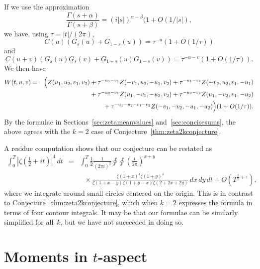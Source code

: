 \documentclass[12pt,letterpaper]{amsart}
\theoremstyle{plain}
\theoremstyle{definition}
\theoremstyle{remark}
\numberwithin{equation}{subsection}
\numberwithin{theorem}{subsection}
\numberwithin{table}{subsection}
\begin{document}
If we use the approximation
\begin{equation}\frac{\Gamma(s+\alpha)}{\Gamma(s+\beta)}=
(i|s|)^{\alpha-\beta}(1+O(1/|s|),
\end{equation}
we have, using $\tau=|t|/(2\pi)$,
\begin{equation}C(u)(G_s(u)+G_{1-s}(u))
= \tau^{-u} (1+O(1/\tau))
\end{equation} and
\begin{equation}C
(u+v)(G_s(u)G_s(v)+G_{1-s}(u)G_{1-s}(v))  = \tau^{-u-v} (1+O(1/\tau)).
\end{equation}
We then have
\begin{eqnarray}
W(t,{u},{v})& =  &\Bigl(Z(u_1,u_2,v_1,v_2)
           + \tau^{-u_1-v_1}Z(-v_1,u_2,-u_1,v_2)
           + \tau^{-u_1-v_2}Z(-v_2,u_2,v_1,-u_1) \nonumber \\
&   &\mbox{} + \tau^{-u_2-v_1}Z(u_1,-v_1,-u_2,v_2)
           + \tau^{-u_2-v_2}Z(u_1,-v_2,v_1,-u_2)\nonumber \\
&   &\mbox{} + \tau^{-u_1-u_2-v_1-v_2}Z(-v_1,-v_2,-u_1,-u_2)\Bigr)(1+O(
1/\tau)) .
\end{eqnarray}
By the formulae in Sections~\ref{sec:zetameanvalues} and~\ref{sec:concisesums}, the above agrees with the
$k=2$ case of Conjecture~\ref{thm:zeta2kconjecture}.

A residue
computation shows that our conjecture can be restated as
\begin{eqnarray} \int_0^T |\zeta(\tfrac12+it)|^4\,dt & =  &\int_0^T
\frac12\frac{1}{(2\pi i)^2} \oint \oint
\left(\frac{t}{2\pi}\right)^{x+y}
\nonumber \\&   &\ \ \ \times \frac{\zeta(1+x)^4\zeta(1+y)^4}
{\zeta(1+x-y)\zeta(1+y-x)\zeta(2+2x+2y)}\,dx\,dy\,dt
+O(T^{\frac12+\varepsilon}),
\end{eqnarray}
where we integrate around small circles centered on the origin.
This is in contrast to Conjecture~\ref{thm:zeta2kconjecture},
which when $k=2$ expresses the formula in terms of four contour integrals.
It may be that our formulae can be similarly simplified for
all~$k$, but we have not succeeded in doing so.


\section{ Moments in $t$-aspect 
}\label{sec:taspectrecipe}
\end{document}
